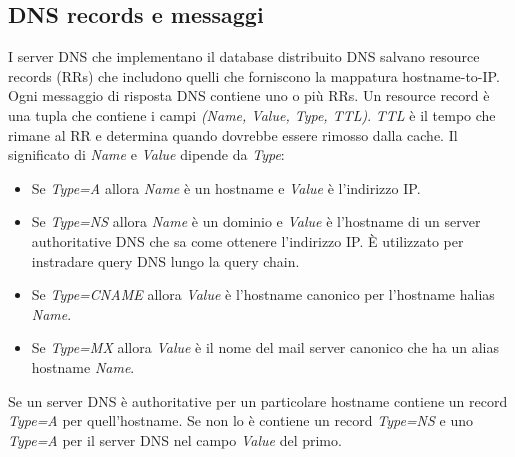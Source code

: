 \subsection{DNS records e messaggi}
I server DNS che implementano il database distribuito DNS salvano resource records (RRs) che includono quelli che forniscono la mappatura hostname-to-IP. Ogni messaggio di risposta DNS contiene
uno o pi\`u RRs. Un resource record \`e una tupla che contiene i campi \emph{(Name, Value, Type, TTL)}. \emph{TTL} \`e il tempo che rimane al RR e determina quando dovrebbe essere rimosso dalla cache. 
Il significato di \emph{Name} e \emph{Value} dipende da \emph{Type}:
\begin{itemize}
\item Se \emph{Type=A} allora \emph{Name} \`e un hostname e \emph{Value} \`e l'indirizzo IP. 
\item Se \emph{Type=NS} allora \emph{Name} \`e un dominio e \emph{Value} \`e l'hostname di un server authoritative DNS che sa come ottenere l'indirizzo IP.  \`E utilizzato per instradare query DNS lungo
la query chain.
\item Se \emph{Type=CNAME} allora \emph{Value} \`e l'hostname canonico per l'hostname halias \emph{Name}.
\item Se \emph{Type=MX} allora \emph{Value} \`e il nome del mail server canonico che ha un alias hostname \emph{Name}. 
\end{itemize}
Se un server DNS \`e authoritative per un particolare hostname contiene un record \emph{Type=A} per quell'hostname. Se non lo \`e contiene un record \emph{Type=NS} e uno \emph{Type=A} per il server 
DNS nel campo \emph{Value} del primo.
